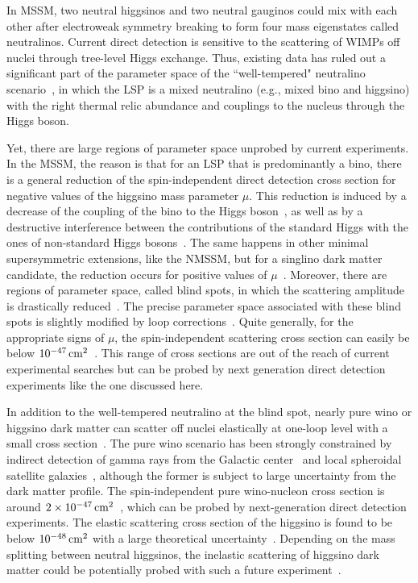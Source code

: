 In MSSM, two neutral higgsinos and two neutral gauginos could mix with each other after electroweak symmetry breaking to form four mass eigenstates called neutralinos. Current direct detection is sensitive to the scattering of WIMPs off nuclei through tree-level Higgs exchange. Thus, existing data has ruled out a significant part of the parameter space of the ``well-tempered" neutralino scenario~\cite{ArkaniHamed:2006mb}, in which the LSP is a mixed neutralino (e.g., mixed bino and higgsino) with the right thermal relic abundance and couplings to the nucleus through the Higgs boson. 

Yet, there are large regions of parameter space unprobed by current experiments. In the MSSM, the reason is that for an LSP that is predominantly a bino, there is a general reduction of the spin-independent direct detection cross section for negative values of the higgsino mass parameter $\mu$. This reduction is induced by a decrease of the coupling of the bino to the Higgs boson~\cite{Cheung:2012qy}, as well as by a destructive interference between the contributions of the standard Higgs with the ones of non-standard Higgs bosons~\cite{Huang:2014xua,Huang:2017kdh}.  The same happens in other minimal supersymmetric extensions, like the NMSSM, but for a singlino dark matter candidate, the reduction occurs for positive values of $\mu$~\cite{Baum:2017enm}. Moreover, there are regions of parameter space, called blind spots, in which the scattering amplitude is drastically reduced~\cite{Cheung:2012qy,Huang:2014xua,Baum:2017enm,Cabrera:2019gaq}. The precise parameter space associated with these blind spots is slightly modified by loop corrections~\cite{Han:2018gej}. Quite generally, for the appropriate signs of $\mu$, the spin-independent scattering cross section can easily be below $10^{-47}\, \mathrm{cm^2}$~\cite{Baum:2017enm,Carena:2018nlf,Cao:2019qng,Wang:2020xta}. This range of cross sections are out of the reach of current experimental searches but can be probed by next generation direct detection experiments like the one discussed here.

In addition to the well-tempered neutralino at the blind spot, nearly pure wino or higgsino dark matter can scatter off nuclei elastically at one-loop level with a small cross section~\cite{Hisano:2011cs, Hill:2011be}. The pure wino scenario has been strongly constrained by indirect detection of gamma rays from the Galactic center~\cite{Cohen:2013ama,Fan:2013faa} and local spheroidal satellite galaxies~\cite{Ackermann:2013yva,Bhattacherjee:2014dya}, although the former is subject to large uncertainty from the dark matter profile. The spin-independent pure wino-nucleon cross section is around $2\times10^{-47}\, \mathrm{cm^2}$~\cite{Hisano:2015rsa}, which can be probed by next-generation direct detection experiments. The elastic scattering cross section of the higgsino is found to be below $10^{-48}\, \mathrm{cm^2}$ with a large theoretical uncertainty~\cite{Hill:2013hoa}. Depending on the mass splitting between neutral higgsinos, the inelastic scattering of higgsino dark matter could be potentially probed with such a future experiment~\cite{Bramante:2016rdh}. 

